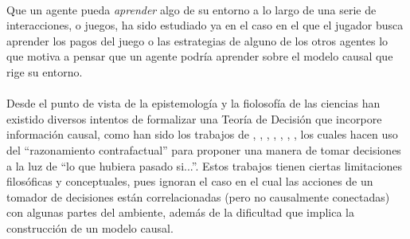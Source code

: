 \documentclass[11pt]{article}
\theoremstyle{plain}
\begin{document}
\\
\indent Que un agente pueda \textit{aprender} algo de su entorno a lo largo de una serie de interacciones, o juegos, ha sido estudiado ya en el caso en el que el jugador busca aprender los pagos del juego o las estrategias de alguno de los otros agentes \cite{fudenberg1998learning} lo que motiva a pensar que un agente podría aprender sobre el modelo causal que rige su entorno. \\
\\
\indent Desde el punto de vista de la epistemología y la fiolosofía de las ciencias han existido diversos intentos de formalizar una Teoría de Decisión que incorpore información causal, como han sido los trabajos de \cite{joyce1999foundations}, \cite{board2006equivalence}, \cite{joyce2012regret}, \cite{ahmed2012push}, \cite{rottman2014reasoning}, \cite{soares2015toward}, \cite{stalnaker2016knowledge}, los cuales hacen uso del “razonamiento contrafactual” para proponer una manera de tomar decisiones a la luz de “lo que hubiera pasado si...”. Estos trabajos tienen ciertas limitaciones filosóficas y conceptuales, pues ignoran el caso en el cual las acciones de un tomador de decisiones están correlacionadas (pero no causalmente conectadas) con algunas partes del ambiente, además de la dificultad que implica la construcción de un modelo causal. 
\end{document}
